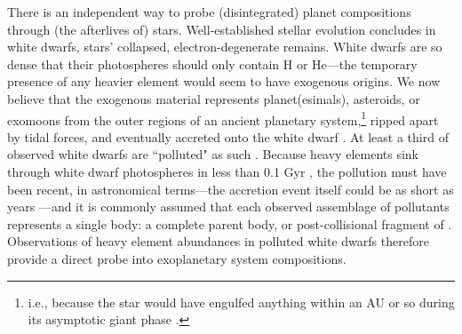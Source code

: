 There is an independent way to probe (disintegrated) planet compositions through (the afterlives of) stars. Well-established stellar evolution concludes in white dwarfs, stars' collapsed, electron-degenerate remains. White dwarfs are so dense that their photospheres should only contain H or He---the temporary presence of any heavier element would seem to have exogenous origins. We now believe that the exogenous material represents planet(esimals), asteroids, or exomoons from the outer regions of an ancient planetary system,\footnote{i.e., because the star would have engulfed anything within an AU or so during its asymptotic giant phase \citep{veras_postmainsequence_2016}.} ripped apart by tidal forces, and eventually accreted onto the white dwarf \citep{jura_extrasolar_2014}. At least a third of observed white dwarfs are ``polluted" as such \citep{koester_frequency_2014}. Because heavy elements sink through white dwarf photospheres in less than 0.1 Gyr \citep{koester_accretion_2009}, the pollution must have been recent, in astronomical terms---the accretion event itself could be as short as years \citep{rogers_nearinfrared_2020}---and it is commonly assumed that each observed assemblage of pollutants represents a single body: a complete parent body, or post-collisional fragment of \citep{jura_extrasolar_2014}. Observations of heavy element abundances in polluted white dwarfs therefore provide a direct probe into exoplanetary system compositions.


